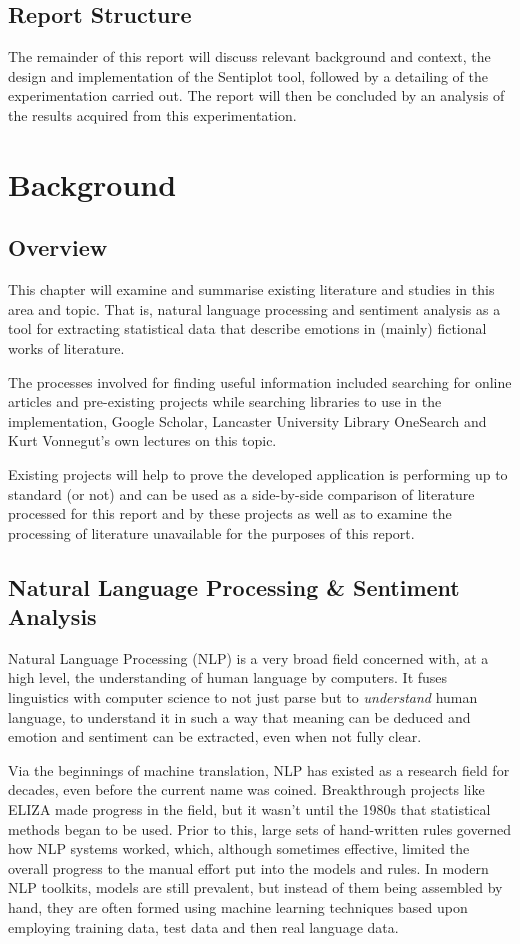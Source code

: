 \documentclass{article}
\begin{document}
    \subsection{Report Structure}
        The remainder of this report will discuss relevant background and context, the design and implementation of the Sentiplot tool, followed by a detailing of the experimentation carried out. The report will then be concluded by an analysis of the results acquired from this experimentation.
\newpage
\section{Background}
\label{sec:background)}
    \subsection{Overview}
        This chapter will examine and summarise existing literature and studies in this area and topic. That is, natural language processing and sentiment analysis as a tool for extracting statistical data that describe emotions in (mainly) fictional works of literature.

        The processes involved for finding useful information included searching for online articles and pre-existing projects while searching libraries to use in the implementation, Google Scholar, Lancaster University Library OneSearch and Kurt Vonnegut’s own lectures on this topic.

        Existing projects will help to prove the developed application is performing up to standard (or not) and can be used as a side-by-side comparison of literature processed for this report and by these projects as well as to examine the processing of literature unavailable for the purposes of this report.
    \subsection{Natural Language Processing \& Sentiment Analysis}
        Natural Language Processing (NLP) is a very broad field concerned with, at a high level, the understanding of human language by computers. It fuses linguistics with computer science to not just parse but to \textit{understand} human language, to understand it in such a way that meaning can be deduced and emotion and sentiment can be extracted, even when not fully clear.

        Via the beginnings of machine translation, NLP has existed as a research field for decades, even before the current name was coined. Breakthrough projects like ELIZA made progress in the field, but it wasn't until the 1980s that statistical methods began to be used. Prior to this, large sets of hand-written rules governed how NLP systems worked, which, although sometimes effective, limited the overall progress to the manual effort put into the models and rules. In modern NLP toolkits, models are still prevalent, but instead of them being assembled by hand, they are often formed using machine learning techniques based upon employing training data, test data and then real language data.
\end{document}
